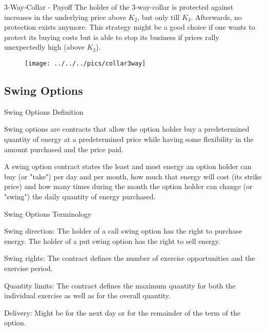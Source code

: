 {3-Way-Collar - Payoff}
The holder of the 3-way-collar is protected against increases in the underlying price above $K_2$, but only till $K_3$. Afterwards, no protection exists anymore. This strategy might be a good choice if one wants to protect its buying costs but is able to stop its business if prices rally unexpectedly high (above $K_3$).
\begin{figure}
	\centering
		\texttt{[image: ../../../pics/collar3way]}
	\label{fig:collar3way}
\end{figure}

\subsection{Swing Options}

{Swing Options Definition}






	Swing options are contracts that allow the option holder buy a predetermined quantity of energy at a predetermined price while having some flexibility in the amount purchased and the price paid.



	A swing option contract states the least and most energy an option holder can buy (or "take") per day and per month, how much that energy will cost (its strike price) and how many times during the month the option holder can change (or "swing") the daily quantity of energy purchased.





{Swing Options Terminology}






	Swing direction: The holder of a call swing option has the right to purchase energy. The holder of a put swing option has the right to sell energy.


	Swing rights: The contract defines the number of exercise opportunities and the exercise period.


	Quantity limits: The contract defines the maximum quantity for both the individual exercise as well as for the overall quantity.


	Delivery: Might be for the next day or for the remainder of the term of the option.





